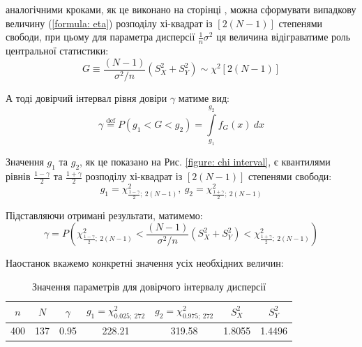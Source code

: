 аналогічними кроками, як це виконано на сторінці \pageref{page: seaching central statistic}, можна сформувати 
випадкову величину (\ref{formula: eta}) розподілу хі-квадрат із $\left[ 2(N-1) \right]$ степенями свободи, 
при цьому для параметра дисперсії $\frac{1}{n}\sigma^2$ ця величина відіграватиме роль центральної статистики:
\begin{equation}
    G\equiv\frac{(N-1)}{\sigma^2/n}\left( S_X^2+S_Y^2 \right)\sim \chi^2\left[ 2(N-1) \right]
\end{equation}

А тоді довірчий інтервал рівня довіри $\gamma$ матиме вид:
\begin{equation}
    \gamma \overset{\mathrm{def}}{=} P(g_1<G<g_2)=\int\limits_{g_1}^{g_2}f_G(x)\ dx
\end{equation}

Значення $g_1$ та $g_2$, як це показано на Рис. \ref{figure: chi interval}, є квантилями рівнів 
$\frac{1-\gamma}{2}$ та $\frac{1+\gamma}{2}$ розподілу хі-квадрат із $\left[ 2(N-1) \right]$ степенями свободи:
\begin{equation*}
    g_1=\chi^2_{\tfrac{1-\gamma}{2};\ 2(N-1)},\  
    g_2=\chi^2_{\tfrac{1+\gamma}{2};\ 2(N-1)}   
\end{equation*}

Підставляючи отримані результати, матимемо:
\begin{equation}
    \gamma = P\left( 
        \chi^2_{\tfrac{1-\gamma}{2};\ 2(N-1)} < 
        \frac{(N-1)}{\sigma^2/n}\left( S_X^2+S_Y^2 \right) < 
        \chi^2_{\tfrac{1+\gamma}{2};\ 2(N-1)} 
    \right) \label{formula: MATH chi trusted interval}
\end{equation}

Наостанок вкажемо конкретні значення усіх необхідних величин:

\vspace{0.8cm}
\begin{table}[H]
    \begin{center}
        \begin{tabular}{||c|c|c|c|c|c|c||}
            \hline
            $n$ & $N$ & $\gamma$ & $g_1=\chi^2_{0.025;\ 272}$ & $g_2=\chi^2_{0.975;\ 272}$ & $S_X^2$ & $S_Y^2$ \\
            \hline \hline
            400 & 137 & 0.95 & 228.21 & 319.58 & 1.8055 & 1.4496 \\
            \hline
        \end{tabular}
        \caption{Значення параметрів для довірчого інтервалу дисперсії}
        \label{table: MATH chi interval}
    \end{center}
\end{table}

